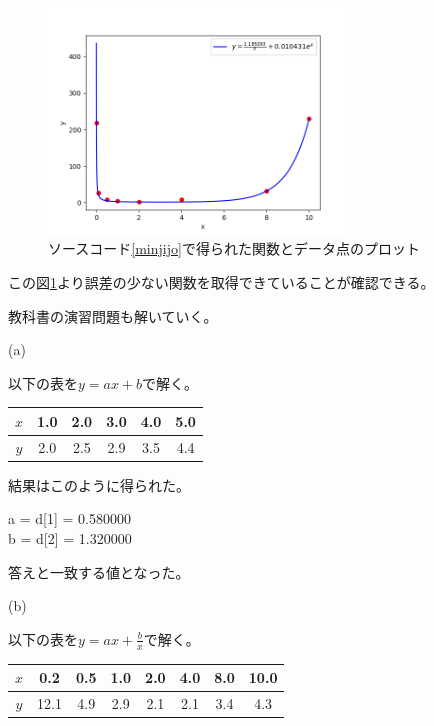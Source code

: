 \documentclass[a4paper,11pt,dvipdfmx]{jsarticle}
\begin{document}
\begin{figure}[h] 
    \centering
    \includegraphics[width=80mm]{./plot.png}
    \caption{ソースコード\ref{minjijo}で得られた関数とデータ点のプロット}
    \label{fig:1}
\end{figure}

この図\ref{fig:1}より誤差の少ない関数を取得できていることが確認できる。

教科書の演習問題も解いていく。

(a) 

以下の表を$y=ax+b$で解く。
\begin{center}
    \begin{tabular}[h]{|c|c|c|c|c|c|} \hline
         $x$  & 1.0 & 2.0 & 3.0 & 4.0 & 5.0 \\ \hline
         $y$  & 2.0 & 2.5 & 2.9 & 3.5 & 4.4 \\ \hline
    \end{tabular}
\end{center}

結果はこのように得られた。

\begin{shaded}
    \noindent
    \centering
    a = d[1] = 0.580000\\
    b = d[2] = 1.320000
\end{shaded}

答えと一致する値となった。

(b) 

以下の表を$y=ax+\frac{b}{x}$で解く。
\begin{center}
    \begin{tabular}[h]{|c|c|c|c|c|c|c|c|} \hline
         $x$  &  0.2 & 0.5 & 1.0 & 2.0 & 4.0 & 8.0 & 10.0 \\ \hline
         $y$  & 12.1 & 4.9 & 2.9 & 2.1 & 2.1 & 3.4 &  4.3 \\ \hline
    \end{tabular}
\end{center}
\end{document}
